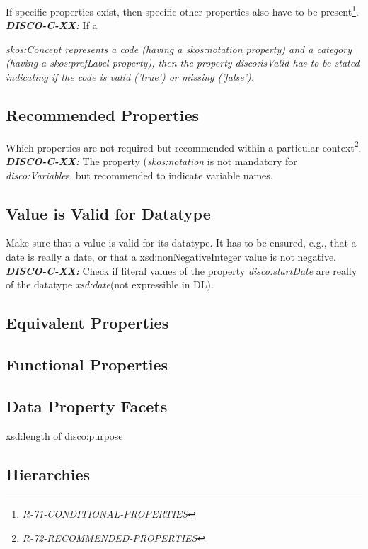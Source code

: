 \documentclass{llncs}
\begin{document}
If specific properties exist, then specific other properties also have to be present\footnote{{\em R-71-CONDITIONAL-PROPERTIES}}.
\textbf{{\em DISCO-C-XX:}}
If a {\em skos:Concept represents a code (having a {\em skos:notation} property) and a category (having a {\em skos:prefLabel} property), 
then the property {\em disco:isValid} has to be stated indicating if the code is valid ('true') or missing ('false').

\subsection{Recommended Properties}

Which properties are not required but recommended within a particular context\footnote{{\em R-72-RECOMMENDED-PROPERTIES}}.
\textbf{{\em DISCO-C-XX:}}
The property ({\em skos:notation} is not mandatory for {\em disco:Variable}s, but recommended to indicate variable names.

\subsection{Value is Valid for Datatype}

Make sure that a value is valid for its datatype.
It has to be ensured, e.g., that a date is really a date, or that a xsd:nonNegativeInteger value is not negative. 
\textbf{{\em DISCO-C-XX:}}
Check if literal values of the property {\em disco:startDate} are really of the datatype {\em xsd:date}(not expressible in DL).

\subsection{Equivalent Properties}

\subsection{Functional Properties}

\subsection{Data Property Facets}

xsd:length of disco:purpose

\subsection{Hierarchies}

}
\end{document}
